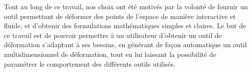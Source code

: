 Tout au long de ce travail, nos choix ont été motivés par la volonté
de fournir un outil permettant de déformer des points de l'espace de
manière interactive et fluide, et d'obtenir des formulations
mathématiques simples et claires. Le but de ce travail est de pouvoir
permettre à un utilisateur d'obtenir un outil de déformation
s'adaptant à ses besoins, en générant de façon automatique un outil
multidimensionnel de déformation, tout en lui laissant la possibilité
de paramétrer le comportement des différents outils utilisés.


